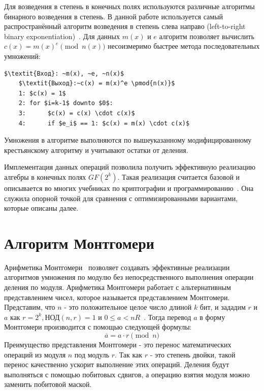 \documentclass[times,specification,annotation]{itmo-student-thesis}
\begin{document}
Для возведения в степень в конечных полях используются различные алгоритмы бинарного возведения в степень.
В данной работе используется самый распространённый алгоритм возведения в степень слева направо (left-to-right binary exponentiation)~\cite{koc97}.
Для данных $m(x)$ и $e$ алгоритм позволяет вычислить $c(x) = m(x)^e \pmod{n(x)}$ несоизмеримо быстрее метода последовательных умножений:
\begin{lstlisting}[mathescape=true]
    $\textit{Вход}: ~m(x), ~e, ~n(x)$
    $\textit{Выход}:~c(x) = m(x)^e \pmod{n(x)}$
    1: $c(x) = 1$
    2: for $i=k-1$ downto $0$:
    3:      $c(x) = c(x) \cdot c(x)$
    4:      if $e_i$ == 1: $c(x) = m(x) \cdot c(x)$
\end{lstlisting}
Умножения в алгоритме выполняются по вышеуказанному модифицированному крестьянскому алгоритму и учитывают остатки от деления.

Имплементация данных операций позволила получить эффективную реализацию алгебры в конечных полях $GF(2^k)$.
Такая реализация считается базовой и описывается во многих учебниках по криптографии и программированию~\cite{men01,sma15,knu97_2}.
Она служила опорной точкой для сравнения с оптимизированными вариантами, которые описаны далее.


\section{Алгоритм Монтгомери}\label{sec:mont}

Арифметика Монтгомери~\cite{men01,sma15} позволяет создавать эффективные реализации алгоритмов умножения по модулю без непосредственного выполнения операции деления по модуля.
Арифметика Монтгомери работает с альтернативным представлением чисел, которое называется представлением Монтгомери.
Представим, что $n$ - это положительное целое число длиной $k$ бит, и зададим $r$ и $a$ как
$r = 2^k, \text{НОД}(n,r) = 1$ и $0 \leq a < nR$~\cite{koc98}.
Тогда перевод $a$ в форму Монтгомери производится с помощью следующей формулы:
\[\overline{a} = a \cdot r \pmod{n}\]
Преимущество представления Монтгомери - это перенос математических операций из модуля $n$ под модуль $r$.
Так как $r$ - это степень двойки, такой перенос качественно ускорит выполнение этих операций.
Деления будут выполняться с помощью побитовых сдвигов, а операцию взятия модуля можно заменить побитовой маской.
\end{document}
